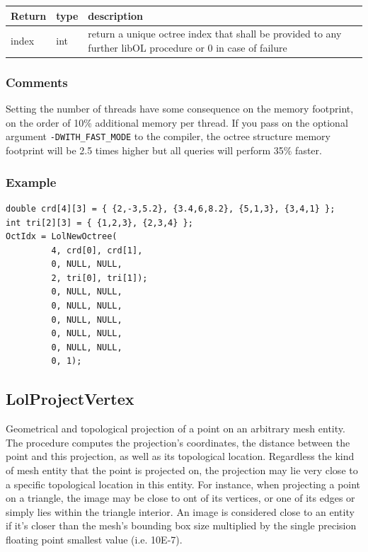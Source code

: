 \documentclass[a4paper,12pt]{article}
\begin{document}
\medskip

\begin{tabular}{|m{2cm}|m{2cm}|m{10cm}|}
\hline
Return     & type   & description \\
\hline
index      & int    & return a unique octree index that shall be provided to any further libOL procedure or 0 in case of failure \\
\hline
\end{tabular}
\subsubsection*{Comments}
Setting the number of threads have some consequence on the memory footprint, on the order of 10\% additional memory per thread.
If you pass on the optional argument {\tt -DWITH\_FAST\_MODE} to the compiler, the octree structure memory footprint will be 2.5 times higher but all queries will perform 35\% faster.

\subsubsection*{Example}

\begin{tt}
\begin{verbatim}
double crd[4][3] = { {2,-3,5.2}, {3.4,6,8.2}, {5,1,3}, {3,4,1} };
int tri[2][3] = { {1,2,3}, {2,3,4} };
OctIdx = LolNewOctree(
         4, crd[0], crd[1],
         0, NULL, NULL,
         2, tri[0], tri[1]);
         0, NULL, NULL,
         0, NULL, NULL,
         0, NULL, NULL,
         0, NULL, NULL,
         0, NULL, NULL,
         0, 1);
\end{verbatim}
\end{tt}
\normalfont


\subsection{LolProjectVertex}
Geometrical and topological projection of a point on an arbitrary mesh entity. The procedure computes the projection's coordinates, the distance between the point and this projection, as well as its topological location. Regardless the kind of mesh entity that the point is projected on, the projection may lie very close to a specific topological location in this entity. For instance, when projecting a point on a triangle, the image may be close to ont of its vertices, or one of its edges or simply lies within the triangle interior. An image is considered close to an entity if it's closer than the mesh's bounding box size multiplied by the single precision floating point smallest value (i.e. 10E-7).
\end{document}

